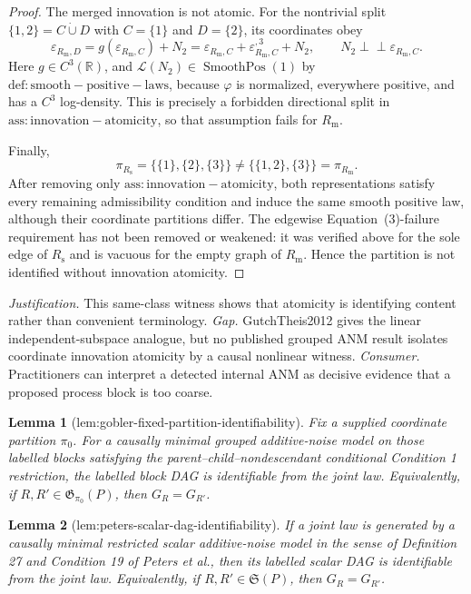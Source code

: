 \documentclass{article}
\newtheorem{lemma}{Lemma}
\begin{document}
\begin{proof}
The merged innovation is not atomic.  For the nontrivial split \(\{1,2\}=C\mathbin{\dot\cup}D\) with \(C=\{1\}\) and \(D=\{2\}\), its coordinates obey
\[
 \varepsilon_{R_{\mathrm{m}},D}
   =g(\varepsilon_{R_{\mathrm{m}},C})+N_2
   =\varepsilon_{R_{\mathrm{m}},C}
      +\varepsilon_{R_{\mathrm{m}},C}^{,3}+N_2,
 \qquad N_2\perp\!\!\!\perp\varepsilon_{R_{\mathrm{m}},C}.
\]
Here \(g\in C^3(\mathbb R)\), and \(\mathcal L(N_2)\in\operatorname{SmoothPos}(1)\) by \(\mathrm{def:smooth-positive-laws}\), because \(\varphi\) is normalized, everywhere positive, and has a \(C^3\) log-density.  This is precisely a forbidden directional split in \(\mathrm{ass:innovation-atomicity}\), so that assumption fails for \(R_{\mathrm{m}}\).

Finally,
\[
 \pi_{R_{\mathrm{s}}}=\bigl\{\{1\},\{2\},\{3\}\bigr\}
 \ne
 \bigl\{\{1,2\},\{3\}\bigr\}=\pi_{R_{\mathrm{m}}}.
\]
After removing only \(\mathrm{ass:innovation-atomicity}\), both representations satisfy every remaining admissibility condition and induce the same smooth positive law, although their coordinate partitions differ.  The edgewise Equation~(3)-failure requirement has not been removed or weakened: it was verified above for the sole edge of \(R_{\mathrm{s}}\) and is vacuous for the empty graph of \(R_{\mathrm{m}}\).  Hence the partition is not identified without innovation atomicity.
\end{proof}
\par\smallskip\noindent \textit{Justification.} This same-class witness shows that atomicity is identifying content rather than convenient terminology. \textit{Gap.} GutchTheis2012 gives the linear independent-subspace analogue, but no published grouped ANM result isolates coordinate innovation atomicity by a causal nonlinear witness. \textit{Consumer.} Practitioners can interpret a detected internal ANM as decisive evidence that a proposed process block is too coarse.

\begin{lemma}[lem:gobler-fixed-partition-identifiability]\label{lem:gobler-fixed-partition-identifiability}
Fix a supplied coordinate partition \(\pi_0\). For a causally minimal grouped additive-noise model on those labelled blocks satisfying the parent--child--nondescendant conditional Condition 1 restriction, the labelled block DAG is identifiable from the joint law. Equivalently, if \(R,R'\in\mathfrak G_{\pi_0}(P)\), then \(G_R=G_{R'}\).
\end{lemma}

\begin{lemma}[lem:peters-scalar-dag-identifiability]\label{lem:peters-scalar-dag-identifiability}
If a joint law is generated by a causally minimal restricted scalar additive-noise model in the sense of Definition 27 and Condition 19 of Peters et al., then its labelled scalar DAG is identifiable from the joint law. Equivalently, if \(R,R'\in\mathfrak S(P)\), then \(G_R=G_{R'}\).
\end{lemma}
\end{document}
